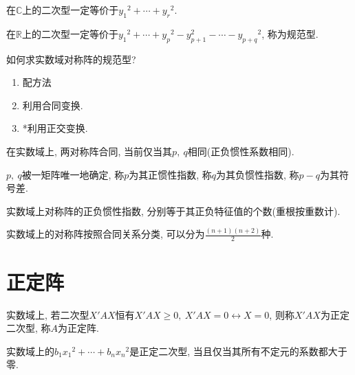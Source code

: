 \begin{inference}
    在$\mathbb{C}$上的二次型一定等价于${y_1}^2+\cdots+{y_r}^2$.\par
    在$\mathbb{R}$上的二次型一定等价于${y_1}^2+\cdots+{y_p}^2-{y_{p+1}^2-\cdots-{y_{p+q}}^2}$, 称为规范型.
\end{inference}

\begin{example}
    如何求实数域对称阵的规范型?\par
    \begin{enumerate}[itemindent=1em]
        \item 配方法
        \item 利用合同变换.
        \item *利用正交变换.
    \end{enumerate}
\end{example}

\begin{theorem}[惯性定理]
    在实数域上, 两对称阵合同, 当前仅当其$p,\ q$相同(正负惯性系数相同).
\end{theorem}

\begin{definition}[惯性指数]
    $p,\ q$被一矩阵唯一地确定, 称$p$为其正惯性指数, 称$q$为其负惯性指数, 称$p-q$为其符号差.
\end{definition}

\begin{inference}
    实数域上对称阵的正负惯性指数, 分别等于其正负特征值的个数(重根按重数计).
\end{inference}

\begin{inference}
    实数域上的对称阵按照合同关系分类, 可以分为$\frac{(n+1)(n+2)}{2}$种.
\end{inference}

\section{ 正定阵 }

\begin{definition}[正定阵]
    实数域上, 若二次型$X'AX$恒有$X'AX\ge 0,\ X'AX=0\leftrightarrow X=0$, 则称$X'AX$为正定二次型, 称$A$为正定阵.
\end{definition}

\begin{example}
    实数域上的$b_1{x_1}^2+\cdots+b_n{x_n}^2$是正定二次型, 当且仅当其所有不定元的系数都大于零.
\end{example}

